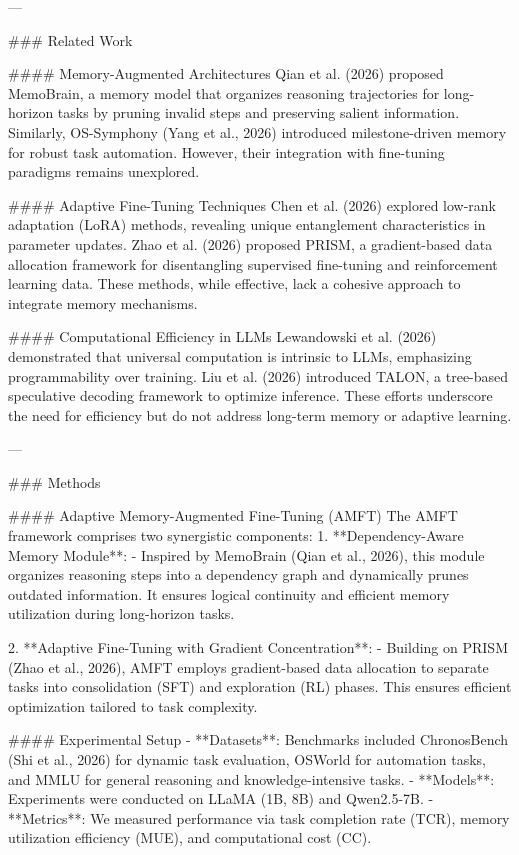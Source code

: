 ---

### Related Work

#### Memory-Augmented Architectures
Qian et al. (2026) proposed MemoBrain, a memory model that organizes reasoning trajectories for long-horizon tasks by pruning invalid steps and preserving salient information. Similarly, OS-Symphony (Yang et al., 2026) introduced milestone-driven memory for robust task automation. However, their integration with fine-tuning paradigms remains unexplored.

#### Adaptive Fine-Tuning Techniques
Chen et al. (2026) explored low-rank adaptation (LoRA) methods, revealing unique entanglement characteristics in parameter updates. Zhao et al. (2026) proposed PRISM, a gradient-based data allocation framework for disentangling supervised fine-tuning and reinforcement learning data. These methods, while effective, lack a cohesive approach to integrate memory mechanisms.

#### Computational Efficiency in LLMs
Lewandowski et al. (2026) demonstrated that universal computation is intrinsic to LLMs, emphasizing programmability over training. Liu et al. (2026) introduced TALON, a tree-based speculative decoding framework to optimize inference. These efforts underscore the need for efficiency but do not address long-term memory or adaptive learning.

---

### Methods

#### Adaptive Memory-Augmented Fine-Tuning (AMFT)
The AMFT framework comprises two synergistic components:
1. **Dependency-Aware Memory Module**:
   - Inspired by MemoBrain (Qian et al., 2026), this module organizes reasoning steps into a dependency graph and dynamically prunes outdated information. It ensures logical continuity and efficient memory utilization during long-horizon tasks.
   
2. **Adaptive Fine-Tuning with Gradient Concentration**:
   - Building on PRISM (Zhao et al., 2026), AMFT employs gradient-based data allocation to separate tasks into consolidation (SFT) and exploration (RL) phases. This ensures efficient optimization tailored to task complexity.

#### Experimental Setup
- **Datasets**: Benchmarks included ChronosBench (Shi et al., 2026) for dynamic task evaluation, OSWorld for automation tasks, and MMLU for general reasoning and knowledge-intensive tasks.
- **Models**: Experiments were conducted on LLaMA (1B, 8B) and Qwen2.5-7B.
- **Metrics**: We measured performance via task completion rate (TCR), memory utilization efficiency (MUE), and computational cost (CC).

